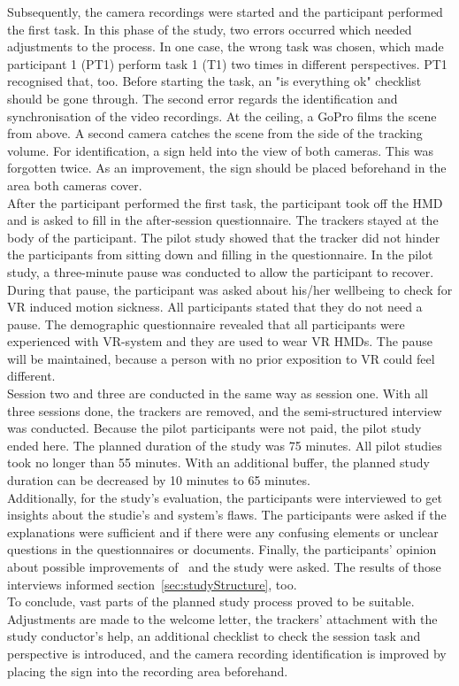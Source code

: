 Subsequently, the camera recordings were started and the participant performed the first task. In this phase of the study, two errors occurred which needed adjustments to the process. In one case, the wrong task was chosen, which made participant 1 (PT1) perform task 1 (T1) two times in different perspectives. PT1 recognised that, too. Before starting the task, an "is everything ok" checklist should be gone through. The second error regards the identification and synchronisation of the video recordings. At the ceiling, a GoPro films the scene from above. A second camera catches the scene from the side of the tracking volume. For identification, a sign held into the view of both cameras. This was forgotten twice. As an improvement, the sign should be placed beforehand in the area both cameras cover.\\
After the participant performed the first task, the participant took off the HMD and is asked to fill in the after-session questionnaire. The trackers stayed at the body of the participant. The pilot study showed that the tracker did not hinder the participants from sitting down and filling in the questionnaire. In the pilot study, a three-minute pause was conducted to allow the participant to recover. During that pause, the participant was asked about his/her wellbeing to check for VR induced motion sickness. All participants stated that they do not need a pause. The demographic questionnaire revealed that all participants were experienced with VR-system and they are used to wear VR HMDs. The pause will be maintained, because a person with no prior exposition to VR could feel different.\\
Session two and three are conducted in the same way as session one. With all three sessions done, the trackers are removed, and the semi-structured interview was conducted. Because the pilot participants were not paid, the pilot study ended here. The planned duration of the study was 75 minutes. All pilot studies took no longer than 55 minutes.  With an additional buffer, the planned study duration can be decreased by 10 minutes to 65 minutes.\\
Additionally, for the study's evaluation, the participants were interviewed to get insights about the studie's and system's flaws. The participants were asked if the explanations were sufficient and if there were any confusing elements or unclear questions in the questionnaires or documents. Finally, the participants' opinion about possible improvements of \exgo\ and the study were asked. The results of those interviews informed section~\ref{sec:studyStructure}, too.\\
To conclude, vast parts of the planned study process proved to be suitable. Adjustments are made to the welcome letter, the trackers' attachment with the study conductor's help, an additional checklist to check the session task and perspective is introduced, and the camera recording identification is improved by placing the sign into the recording area beforehand.

